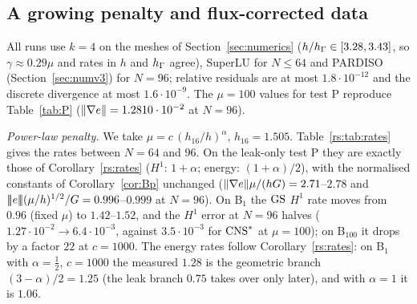 \subsection{A growing penalty and flux-corrected data}\label{rs:sec:num}
All runs use $k=4$ on the meshes of Section~\ref{sec:numerics} ($h/h_\Gamma\in[3.28,3.43]$, so $\gamma\approx0.29\mu$ and rates in $h$ and $h_\Gamma$ agree), SuperLU for $N\le64$ and PARDISO (Section~\ref{sec:numv3}) for $N=96$; relative residuals are at most $1.8\cdot10^{-12}$ and the discrete divergence at most $1.6\cdot10^{-9}$. The $\mu=100$ values for test P reproduce Table~\ref{tab:P} ($\lVert \nabla e\rVert=1.2810\cdot10^{-2}$ at $N=96$).

\emph{Power-law penalty.} We take $\mu=c\,(h_{16}/h)^\alpha$, $h_{16}=1.505$. Table~\ref{rs:tab:rates} gives the rates between $N=64$ and $96$. On the leak-only test P they are exactly those of Corollary~\ref{rs:rates} ($H^1$: $1+\alpha$; energy: $(1+\alpha)/2$), with the normalised constants of Corollary~\ref{cor:Bp} unchanged ($\lVert \nabla e\rVert\mu/(hG)=2.71$--$2.78$ and $|\!|\!|e|\!|\!|(\mu/h)^{1/2}/G=0.996$--$0.999$ at $N=96$). On B$_1$ the $\mathrm{GS}$ $H^1$ rate moves from $0.96$ (fixed $\mu$) to $1.42$--$1.52$, and the $H^1$ error at $N=96$ halves ($1.27\cdot10^{-2}\to6.4\cdot10^{-3}$, against $3.5\cdot10^{-3}$ for $\mathrm{CNS}^\ast$ at $\mu=100$); on B$_{100}$ it drops by a factor $22$ at $c=1000$. The energy rates follow Corollary~\ref{rs:rates}: on B$_1$ with $\alpha=\frac12$, $c=1000$ the measured $1.28$ is the geometric branch $(3-\alpha)/2=1.25$ (the leak branch $0.75$ takes over only later), and with $\alpha=1$ it is $1.06$.

